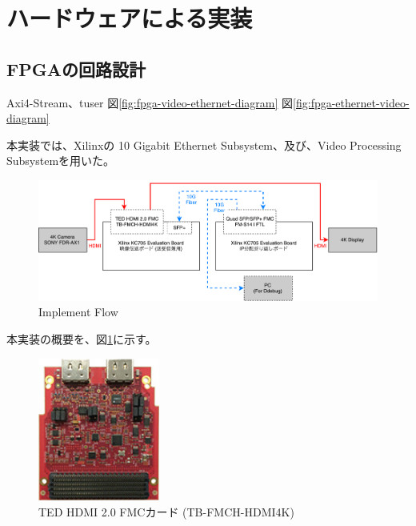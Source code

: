 \section{ハードウェアによる実装}

\subsection{FPGAの回路設計}

Axi4-Stream、tuser
図\ref{fig:fpga-video-ethernet-diagram}
図\ref{fig:fpga-ethernet-video-diagram}

本実装では、Xilinxの 10 Gigabit Ethernet Subsystem、及び、Video Processing Subsystemを用いた。

\begin{figure}[htbp]
    \begin{center}
        \includegraphics[bb=0 0 841 299,width=15.5cm]{img/fpga-implement-flow.pdf}
    \end{center}
    \caption{Implement Flow}
    \label{fig:fpga-implement-flow}
\end{figure}

本実装の概要を、図\ref{fig:fpga-implement-flow}に示す。

\begin{figure}[htbp]
    \begin{center}
        \includegraphics[bb=0 0 137 161,width=4cm]{img/ted-4k-fmc-card.jpg}
    \end{center}
    \caption{TED HDMI 2.0 FMCカード (TB-FMCH-HDMI4K)}
    \label{fig:ted-4k-fmc-card}
\end{figure}

